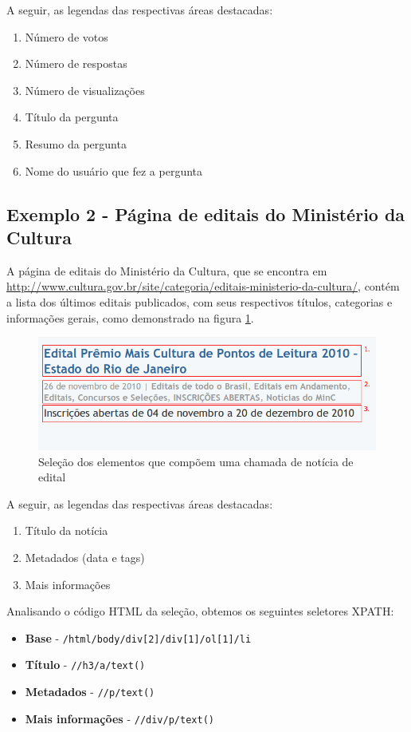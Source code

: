 A seguir, as legendas das respectivas áreas destacadas:

\begin{enumerate}
	\item Número de votos
	\item Número de respostas
	\item Número de visualizações
	\item Título da pergunta
	\item Resumo da pergunta
	\item Nome do usuário que fez a pergunta
\end{enumerate}


\subsection{Exemplo 2 - Página de editais do Ministério da Cultura}

A página de editais do Ministério da Cultura, que se encontra em \url{http://www.cultura.gov.br/site/categoria/editais-ministerio-da-cultura/}, contém a lista dos últimos editais publicados, com seus respectivos títulos, categorias e informações gerais, como demonstrado na figura \ref{minc}.

\begin{figure} [ht]
	\centering
	\includegraphics[scale=0.8]{minc.png}
	\caption{Seleção dos elementos que compõem uma chamada de notícia de edital}
	\label{minc}
\end{figure}

A seguir, as legendas das respectivas áreas destacadas:

\begin{enumerate}
	\item Título da notícia
	\item Metadados (data e tags)
	\item Mais informações
\end{enumerate}

Analisando o código HTML da seleção, obtemos os seguintes seletores XPATH:

\begin{itemize}
	\item \textbf{Base} - \texttt{/html/body/div[2]/div[1]/ol[1]/li}
	\item \textbf{Título} - \texttt{//h3/a/text()}
	\item \textbf{Metadados} - \texttt{//p/text()}
	\item \textbf{Mais informações} - \texttt{//div/p/text()}
\end{itemize}

